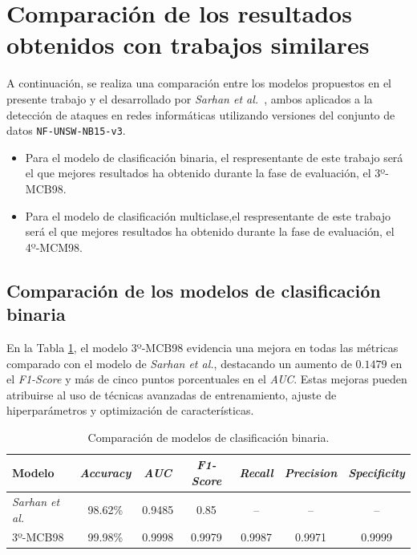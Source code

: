\section{Comparación de los resultados obtenidos con trabajos similares}

A continuación, se realiza una comparación entre los modelos propuestos en el presente trabajo y el desarrollado por \textit{Sarhan et al.}~\cite{sarhan2020netflow}, ambos aplicados a la detección de ataques en redes informáticas utilizando versiones del conjunto de datos \texttt{NF-UNSW-NB15-v3}.

\begin{itemize}
	\item Para el modelo de clasificación binaria, el respresentante de este trabajo será el que mejores resultados ha obtenido durante la fase de evaluación, el 3º-MCB98.
	\item Para el modelo de clasificación multiclase,el respresentante de este trabajo será el que mejores resultados ha obtenido durante la fase de evaluación, el 4º-MCM98. 
\end{itemize}


\subsection{Comparación de los modelos de clasificación binaria}

En la Tabla \ref{tab:compbin}, el modelo 3º-MCB98 evidencia una mejora en todas las métricas comparado con el modelo de \textit{Sarhan et al.}, destacando un aumento de $0.1479$ en el \textit{F1-Score} y más de cinco puntos porcentuales en el \textit{AUC}. Estas mejoras pueden atribuirse al uso de técnicas avanzadas de entrenamiento, ajuste de hiperparámetros y optimización de características.

\begin{table}[H]
\centering
\begin{tabular}{|l|c|c|c|c|c|c|}
\hline
\textbf{Modelo} & \textbf{\textit{Accuracy}} & \textbf{\textit{AUC}} & \textbf{\textit{F1-Score}} & \textbf{\textit{Recall}} & \textbf{\textit{Precision}} & \textbf{\textit{Specificity}} \\
\hline
\textit{Sarhan et al.} & 98.62\% & 0.9485 & 0.85 & -- & -- & -- \\
3º-MCB98 & 99.98\% & 0.9998 & 0.9979 & 0.9987 & 0.9971 & 0.9999 \\
\hline
\end{tabular}
\caption{Comparación de modelos de clasificación binaria.}
\label{tab:compbin}
\end{table}

